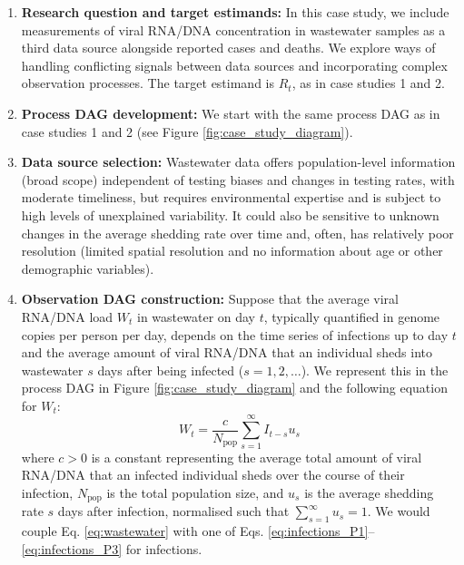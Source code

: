 \documentclass{article}
\begin{document}
\begin{enumerate}
   \item \textbf{Research question and target estimands:} In this case study, we include measurements of viral RNA/DNA concentration in wastewater samples as a third data source alongside reported cases and deaths. We explore ways of handling conflicting signals between data sources and incorporating complex observation processes. The target estimand is $R_t$, as in case studies 1 and 2.
   
    \item \textbf{Process DAG development:} We start with the same process \ac{DAG} as in case studies 1 and 2 (see Figure \ref{fig:case_study_diagram}).

    \item \textbf{Data source selection:} Wastewater data offers population-level information (broad scope) independent of testing biases and changes in testing rates, with moderate timeliness, but requires environmental expertise and is subject to high levels of unexplained variability. It could also be sensitive to unknown changes in the average shedding rate over time and, often, has relatively poor resolution (limited spatial resolution and no information about age or other demographic variables). 

    
    \item \textbf{Observation DAG construction:} 
    Suppose that the average viral \ac{RNA}/\ac{DNA} load $W_t$ in wastewater on day $t$, typically quantified in genome copies per person per day, depends on the time series of infections up to day $t$ and the average amount of viral \ac{RNA}/\ac{DNA} that an individual sheds into wastewater $s$ days after being infected ($s=1,2,\ldots$). We represent this in the process \ac{DAG} in Figure \ref{fig:case_study_diagram} and the following equation for $W_t$:
    \begin{equation} \label{eq:wastewater}
        W_t = \frac{c}{N_\mathrm{pop}}\sum_{s=1}^\infty I_{t-s}u_s 
    \end{equation}
    where $c>0$ is a constant representing the average total amount of viral \ac{RNA}/\ac{DNA} that an infected individual sheds over the course of their infection, $N_\mathrm{pop}$ is the total population size, and $u_s$ is the average shedding rate $s$ days after infection, normalised such that $\sum_{s=1}^\infty u_s=1$. We would couple Eq. \eqref{eq:wastewater} with one of Eqs. \eqref{eq:infections_P1}--\eqref{eq:infections_P3} for infections.
    

\end{enumerate}
\end{document}
